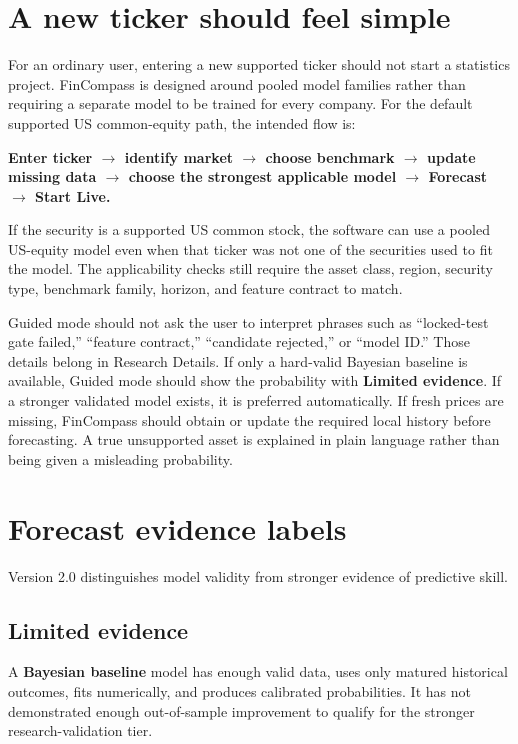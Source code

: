 \documentclass[11pt]{article}
\begin{document}
\section{A new ticker should feel simple}
For an ordinary user, entering a new supported ticker should not start a statistics project. FinCompass is designed around pooled model families rather than requiring a separate model to be trained for every company. For the default supported US common-equity path, the intended flow is:
\begin{center}
\textbf{Enter ticker $\rightarrow$ identify market $\rightarrow$ choose benchmark $\rightarrow$ update missing data $\rightarrow$ choose the strongest applicable model $\rightarrow$ Forecast $\rightarrow$ Start Live.}
\end{center}
If the security is a supported US common stock, the software can use a pooled US-equity model even when that ticker was not one of the securities used to fit the model. The applicability checks still require the asset class, region, security type, benchmark family, horizon, and feature contract to match.

Guided mode should not ask the user to interpret phrases such as ``locked-test gate failed,'' ``feature contract,'' ``candidate rejected,'' or ``model ID.'' Those details belong in Research Details. If only a hard-valid Bayesian baseline is available, Guided mode should show the probability with \textbf{Limited evidence}. If a stronger validated model exists, it is preferred automatically. If fresh prices are missing, FinCompass should obtain or update the required local history before forecasting. A true unsupported asset is explained in plain language rather than being given a misleading probability.

\section{Forecast evidence labels}
Version 2.0 distinguishes model validity from stronger evidence of predictive skill.

\subsection{Limited evidence}
A \textbf{Bayesian baseline} model has enough valid data, uses only matured historical outcomes, fits numerically, and produces calibrated probabilities. It has not demonstrated enough out-of-sample improvement to qualify for the stronger research-validation tier.
\end{document}
